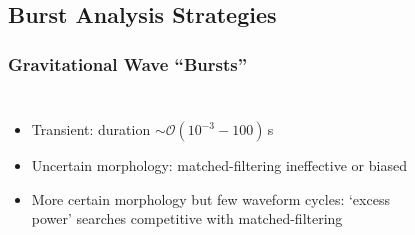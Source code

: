 \documentclass{beamer}
\begin{document}
\subsection{Burst Analysis Strategies}
\begin{frame}
    \frametitle{Gravitational Wave ``Bursts''}

    \begin{columns}[]
        \begin{itemize}
            \item Transient: duration $\sim \mathcal{O}(10^{-3}-100)$\,s
            \item Uncertain morphology: matched-filtering ineffective or biased
            \item More certain morphology but few waveform cycles: `excess
                power' searches competitive with matched-filtering
        \end{itemize}

        \vspace{-1cm}
        \begin{figure}
            \centering
             \\
        \end{figure}

    \end{columns}

\end{frame}
\end{document}
